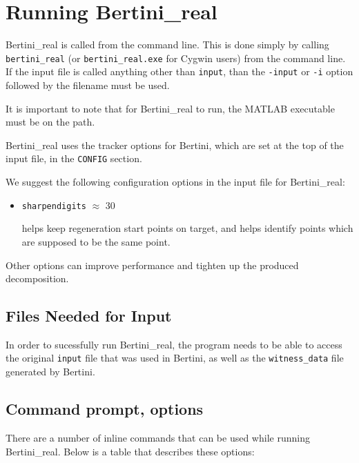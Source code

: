 
\section{Running Bertini\_real}
\label{sec:running_br}

Bertini\_real is called from the command line.   This is done simply by calling \texttt{bertini\_real} (or \texttt{bertini\_real.exe} for Cygwin users) from the command line. If the input file is called anything other than \texttt{input}, than the \texttt{-input} or \texttt{-i} option followed by the filename must be used. 

It is important to note that for Bertini\_real to run, the MATLAB executable must be on the path.


Bertini\_real uses the tracker options for Bertini, which are set at the top of the input file, in the {\tt CONFIG} section.

We suggest the following configuration options in the input file for Bertini\_real: 
\begin{itemize}
\item {\tt sharpendigits} $\approx$ 30

helps keep regeneration start points on target, and helps identify points which are supposed to be the same point.
\end{itemize}


Other options can improve performance and tighten up the produced decomposition. 


\subsection{Files Needed for Input}
In order to sucessfully run Bertini\_real, the program needs to be able to access the original \texttt{input} file that was used in Bertini, as well as the \texttt{witness\_data} file generated by Bertini.


\subsection{Command prompt, options}
There are a number of inline commands that can be used while running Bertini\_real. Below is a table that describes these options:

